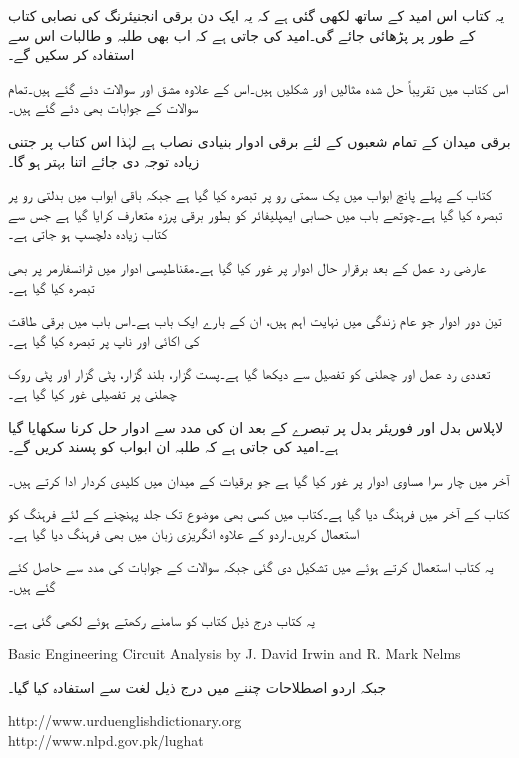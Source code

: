 یہ کتاب اس امید کے ساتھ لکھی گئی ہے کہ یہ ایک دن برقی انجنیئرنگ کی نصابی کتاب کے طور پر پڑھائی جائے گی۔امید کی جاتی ہے کہ اب بھی طلبہ و طالبات اس سے استفادہ کر سکیں گے۔


اس کتاب میں تقریباً  حل شدہ مثالیں اور  شکلیں ہیں۔اس کے علاوہ   مشق اور  سوالات دئے گئے ہیں۔تمام سوالات کے جوابات بھی دئے گئے ہیں۔

برقی میدان کے تمام شعبوں کے لئے برقی ادوار بنیادی نصاب ہے لہٰذا اس کتاب پر جتنی زیادہ توجہ دی جائے اتنا بہتر ہو گا۔

کتاب کے پہلے پانچ ابواب میں یک سمتی رو پر تبصرہ کیا گیا ہے جبکہ باقی ابواب میں بدلتی رو پر تبصرہ کیا گیا ہے۔چوتھے باب میں حسابی ایمپلیفائر کو بطور برقی پرزہ متعارف کرایا گیا ہے جس سے  کتاب زیادہ دلچسپ ہو جاتی ہے۔  

عارضی رد عمل کے بعد برقرار حال ادوار پر غور کیا گیا ہے۔مقناطیسی ادوار میں ٹرانسفارمر پر بھی تبصرہ کیا گیا ہے۔

تین دور ادوار جو عام زندگی میں نہایت اہم ہیں، ان کے بارے  ایک باب ہے۔اس باب میں برقی طاقت کی اکائی اور ناپ پر تبصرہ کیا گیا ہے۔
 

تعددی رد عمل اور چھلنی کو تفصیل سے دیکھا گیا ہے۔پست گزار، بلند گزار، پٹی گزار اور پٹی روک چھلنی پر تفصیلی غور کیا گیا ہے۔

لاپلاس بدل اور فوریئر بدل پر تبصرے کے بعد ان کی مدد سے ادوار حل کرنا سکھایا گیا ہے۔امید کی جاتی ہے کہ طلبہ ان ابواب کو پسند کریں گے۔

آخر میں چار سرا مساوی ادوار پر غور کیا گیا ہے جو برقیات کے میدان میں کلیدی کردار ادا کرتے ہیں۔

کتاب کے آخر میں فرہنگ دیا گیا ہے۔کتاب میں کسی بھی موضوع تک جلد پہنچنے کے لئے فرہنگ کو استعمال کریں۔اردو کے علاوہ انگریزی زبان میں بھی فرہنگ دیا گیا ہے۔

یہ کتاب  استعمال کرتے ہوئے  میں تشکیل دی گئی جبکہ سوالات کے جوابات  کی مدد سے حاصل کئے گئے ہیں۔

یہ کتاب درج ذیل کتاب کو سامنے رکھتے ہوئے لکھی گئی ہے۔

{
\begin{otherlanguage}{english}
Basic Engineering Circuit Analysis by J. David Irwin and R. Mark Nelms
\end{otherlanguage}
}

جبکہ اردو اصطلاحات چننے میں درج ذیل لغت سے استفادہ  کیا گیا۔

{
\begin{otherlanguage}{english}
http:/\!\!/www.urduenglishdictionary.org\\
http:/\!\!/www.nlpd.gov.pk/lughat
\end{otherlanguage}
}

